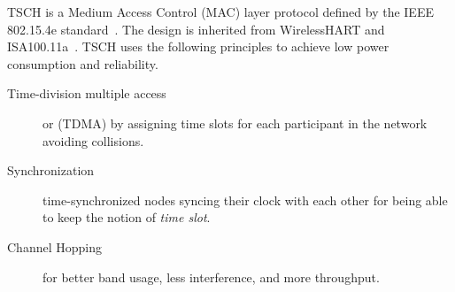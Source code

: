 %
%

TSCH is a Medium Access Control (MAC) layer protocol defined by the IEEE
802.15.4e standard~\cite{rfc7554}.
The design is inherited from WirelessHART and
ISA100.11a~\cite{Duquennoy2017TSCHA6}.
TSCH uses the following principles to achieve low power consumption and
reliability.

\begin{description}
  \item[Time-division multiple access] or (TDMA) by assigning time slots for each
    participant in the network avoiding collisions.
  \item[Synchronization] time-synchronized nodes syncing their clock with each
    other for being able to keep the notion of \emph{time slot}.
  \item[Channel Hopping] for better band usage, less interference, and more
    throughput.
\end{description}

